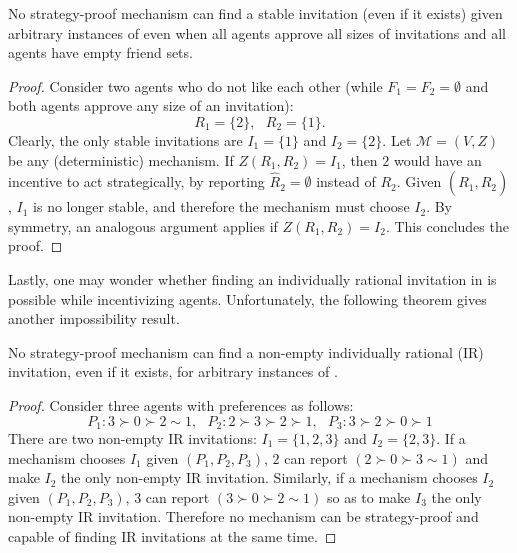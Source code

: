 \begin{theorem} \label{GT:thm:impossibility_only_enemies}
No strategy-proof mechanism can find a stable invitation (even if it exists) given arbitrary instances of \SIPs even when all agents approve all sizes of invitations and all agents have empty friend sets. 
\end{theorem}
\begin{proof}
Consider two agents who do not like each other (while $F_1=F_2=\emptyset$ and both agents approve any size of an invitation):
	\begin{equation*}
			R_1 = \{2\}, ~~~ R_2 = \{1\}.
	\end{equation*}
	Clearly, the only stable invitations are $I_1 = \{1\}$ and $I_2 = \{2\}$. 
	Let $\mathcal{M} = (V, Z)$ be any (deterministic) mechanism.	
	If $Z(R_1, R_2) = I_1$, then $2$ would have an incentive to act strategically, by reporting $\hat{R}_2 = \emptyset$ instead of $R_2$. Given $(R_1, \hat{R}_2)$, $I_1$ is no longer stable, and therefore the mechanism must choose $I_2$. By symmetry, an analogous argument applies if $Z(R_1, R_2) = I_2$. This concludes the proof. 
\end{proof}


Lastly, one may wonder whether finding an individually rational invitation in \AOIPs is possible while incentivizing agents. Unfortunately, the following theorem gives another impossibility result. 

\begin{theorem} \label{GT:thm:impossibility_IR}
	No strategy-proof mechanism can find a non-empty individually rational (IR) invitation, even if it exists, for arbitrary instances of \AOIP.
\end{theorem}
\begin{proof}
Consider three agents with preferences as follows:
\begin{equation*}
			P_1: 3\succ 0 \succ 2 \sim 1,~~~ P_2: 2 \succ 3 \succ 2 \succ 1,~~~ P_3: 3 \succ 2 \succ 0 \succ 1
\end{equation*}
There are two non-empty IR invitations: $I_1 = \{1, 2, 3\}$ and $I_2 = \{2, 3\}$. 
If a mechanism chooses $I_1$ given $(P_1, P_2, P_3)$, $2$ can report $(2 \succ 0 \succ 3 \sim 1)$ and make $I_2$ the only non-empty IR invitation. Similarly, if a mechanism chooses $I_2$ given $(P_1, P_2, P_3)$, $3$ can report $(3 \succ 0 \succ 2 \sim 1)$ so as to make $I_3$ the only non-empty IR invitation. Therefore no mechanism can be strategy-proof and capable of finding IR invitations at the same time.
\end{proof}



